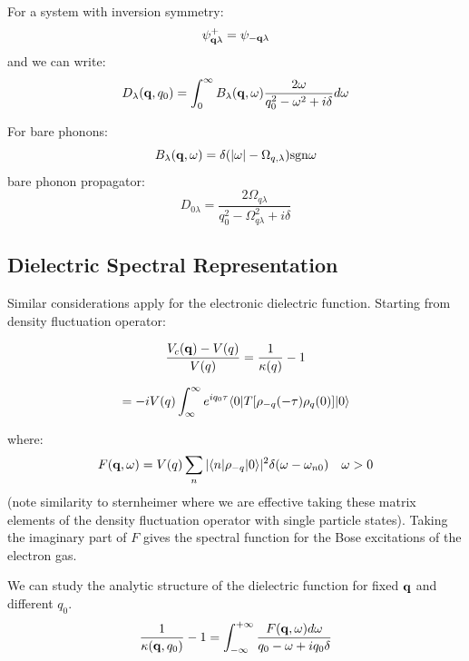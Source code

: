 For a system with inversion symmetry:
%
\begin{equation}
\psi_{{\bf q}\lambda}^{+} = \psi_{-{\bf q}\lambda}
\end{equation}
%
and we can write:
%
\begin{equation}
D_{\lambda}({\bf q},q_{0}) = \int_{0}^{\infty}B_{\lambda}({\bf q},\omega) \frac{2\omega}{q^{2}_{0}-\omega^{2}+i\delta}d\omega
\end{equation}
%

For bare phonons:
%
\begin{equation}
B_{\lambda}({\bf q},\omega) = \delta(|\omega| - \Omega_{q,\lambda}){\rm sgn} \omega
\end{equation}
%
bare phonon propagator:
%
\begin{equation}
D_{0\lambda} = \frac{2\Omega_{q\lambda}}{q_{0}^{2} - \Omega^{2}_{q\lambda}+i\delta}
\end{equation}

\subsection{Dielectric Spectral Representation}
Similar considerations apply for the electronic dielectric function.
Starting from density fluctuation operator:

\begin{equation}
\frac{V_{c}({\bf q}) - V(q)}{V(q)} = \frac{1}{\kappa(q)}-1
\end{equation}

\begin{equation}
= -iV(q) \int_{\infty}^{\infty} e^{iq_{0}\tau} \langle 0|T[\rho_{-q}(-\tau)\rho_{q}(0)]|0\rangle
\end{equation}
%

where:
%
\begin{equation}
F({\bf q},\omega) = V(q) \sum_{n} |\langle n|\rho_{-q}| 0\rangle|^{2}\delta(\omega - \omega_{n0}) \quad \omega>0
\end{equation}
%
(note similarity to sternheimer where we are effective taking these matrix elements of the density fluctuation
operator with single particle states). Taking the imaginary part of $F$ gives the spectral function
for the Bose excitations of the electron gas.

We can study the analytic structure of the dielectric function for fixed ${\bf q}$ and different $q_{0}$.
%
\begin{equation}
\frac{1}{\kappa({\bf q},q_{0})} - 1 = \int_{-\infty}^{+\infty} \frac{F({\bf q},\omega) d\omega}{q_{0} - \omega + iq_{0}\delta}
\end{equation}
%


